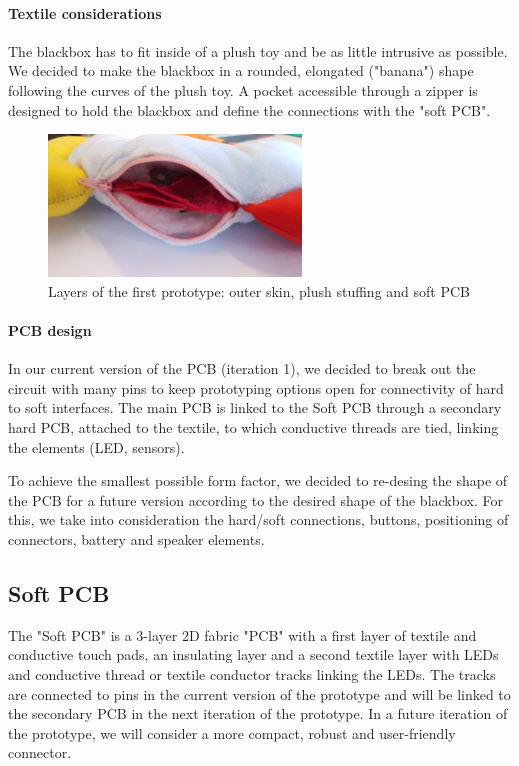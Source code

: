 \paragraph{Textile considerations}
The blackbox has to fit inside of a plush toy and be as little intrusive as possible. We decided to make the blackbox in a rounded, elongated ("banana") shape following the curves of the plush toy. A pocket accessible through a zipper is designed to hold the blackbox and define the connections with the "soft PCB".

\begin{figure}[ht]
    \centering
    \includegraphics[width=0.6\textwidth]{images/HW/proto2_layers.jpg}
    \caption{Layers of the first prototype: outer skin, plush stuffing and soft PCB}
    \label{fig:heat_tracks}
\end{figure}

    \paragraph{PCB design}
In our current version of the PCB (iteration 1), we decided to break out the circuit with many pins to keep prototyping options open for connectivity of hard to soft interfaces. The main PCB is linked to the Soft PCB through a secondary hard PCB, attached to the textile, to which conductive threads are tied, linking the elements (LED, sensors).
    
To achieve the smallest possible form factor, we decided to re-desing the shape of the PCB for a future version according to the desired shape of the blackbox. For this, we take into consideration the hard/soft connections, buttons, positioning of connectors, battery and speaker elements. 

\subsection{Soft PCB} The "Soft PCB" is a 3-layer 2D fabric "PCB" with a first layer of textile and conductive touch pads, an insulating layer and a second textile layer with LEDs and conductive thread or textile conductor tracks linking the LEDs. The tracks are connected to pins in the current version of the prototype and will be linked to the secondary PCB in the next iteration of the prototype. In a future iteration of the prototype, we will consider a more compact, robust and user-friendly connector.


